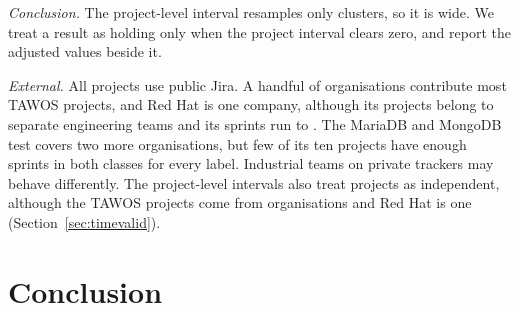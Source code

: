 \emph{Conclusion.} The project-level interval resamples only \NProj{} clusters, so it is wide. We treat a result as holding only when the project interval clears zero, and report the adjusted values beside it.

\emph{External.} All projects use public Jira. A handful of organisations contribute most TAWOS projects, and Red Hat is one company, although its projects belong to separate engineering teams and its sprints run to \RHTo. The MariaDB and MongoDB test covers two more organisations, but few of its ten projects have enough sprints in both classes for every label. Industrial teams on private trackers may behave differently. The project-level intervals also treat projects as independent, although the TAWOS projects come from \TvOrgT{} organisations and Red Hat is one (Section~\ref{sec:timevalid}).

\section{Conclusion}

